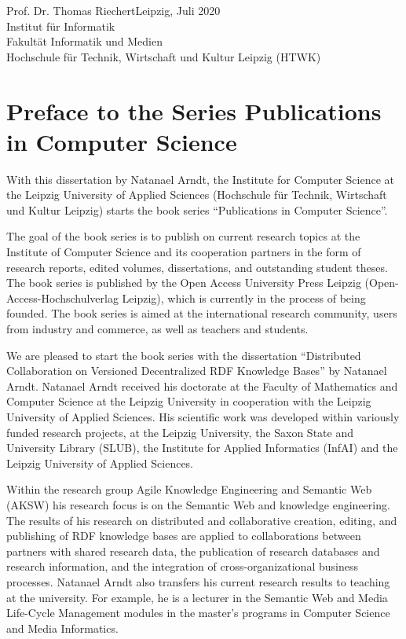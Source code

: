 \noindent
Prof. Dr. Thomas Riechert\hfill Leipzig, Juli 2020\\
Institut für Informatik\\
Fakultät Informatik und Medien\\
Hochschule für Technik, Wirtschaft und Kultur Leipzig (HTWK)

\clearpage

\section*{Preface to the Series Publications in Computer Science}

With this dissertation by Natanael Arndt, the Institute for Computer Science at the Leipzig University of Applied Sciences (Hochschule für Technik, Wirtschaft und Kultur Leipzig) starts the book series “Publications in Computer Science”.


The goal of the book series is to publish on current research topics at the Institute of Computer Science and its cooperation partners in the form of research reports, edited volumes, dissertations, and outstanding student theses. The book series is published by the Open Access University Press Leipzig (Open-Access-Hochschulverlag Leipzig), which is currently in the process of being founded. The book series is aimed at the international research community, users from industry and commerce, as well as teachers and students.

We are pleased to start the book series with the dissertation “Distributed Collaboration on Versioned Decentralized RDF Knowledge Bases” by Natanael Arndt. Natanael Arndt received his doctorate at the Faculty of Mathematics and Computer Science at the Leipzig University in cooperation with the Leipzig University of Applied Sciences. His scientific work was developed within variously funded research projects, at the Leipzig University, the Saxon State and University Library (SLUB), the Institute for Applied Informatics (InfAI) and the Leipzig University of Applied Sciences.

Within the research group Agile Knowledge Engineering and Semantic Web (AKSW) his research focus is on the Semantic Web and knowledge engineering. The results of his research on distributed and collaborative creation, editing, and publishing of RDF knowledge bases are applied to collaborations between partners with shared research data, the publication of research databases and research information, and the integration of cross-organizational business processes.
Natanael Arndt also transfers his current research results to teaching at the university. For example, he is a lecturer in the Semantic Web and Media Life-Cycle Management modules in the master's programs in Computer Science and Media Informatics.

